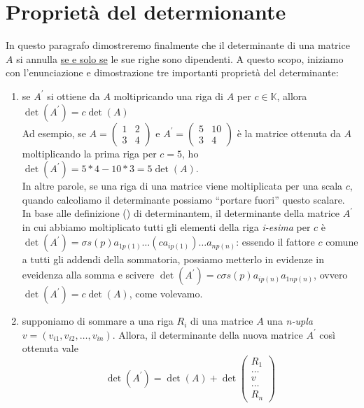 \section{Proprietà del determionante}
In questo paragrafo dimostreremo finalmente che il determinante di una matrice $A$ si annulla \underline{se e solo se} le sue righe sono dipendenti. A questo scopo, iniziamo con l'enunciazione e dimostrazione tre importanti proprietà del determinante:
\begin{enumerate}
\item se $A^\prime$ si ottiene da $A$ moltipricando una riga di $A$ per $c\in \mathds{K}$, allora $\det(A^\prime)=c\det(A)$\\
  Ad esempio, se $A=\begin{pmatrix} 1 & 2 \\ 3 & 4 \end{pmatrix}$ e $A^\prime =\begin{pmatrix} 5 & 10 \\ 3 &4 \end{pmatrix}$ è la matrice ottenuta da $A$ moltiplicando la prima riga per $c=5$, ho $\det(A^\prime)=5*4-10*3=5\det (A)$.\\
  In altre parole, se una riga di una matrice viene moltiplicata per una scala $c$, quando calcoliamo il determinante possiamo ``portare fuori'' questo scalare.\\
  In base alle definizione ({\it <++>}) di determinantem, il determinante della matrice $A^\prime$ in cui abbiamo moltiplicato tutti gli elementi della riga \textit{i-esima} per $c$ è $\det (A^\prime)=\sigma s(p)a_{1p(1)}\dots(ca_{ip(1)})\dots a_{np(n)}$: essendo il fattore $c$ comune a tutti gli addendi della sommatoria, possiamo metterlo in evidenze in eveidenza alla somma e scivere $\det(A^\prime) = c \sigma s(p)a_{ip(n)}a_{1np(n)}$, ovvero $\det(A^\prime)=c\det(A)$, come volevamo.
\item supponiamo di sommare a una riga $R_i$ di una matrice $A$ una \textit{n-upla} $v=(v_{i1},v_{i2},\dots,v_{in})$. Allora, il determinante della nuova matrice $A^\prime$ così ottenuta vale
  \begin{equation}
    \det(A^{\prime})=\det(A)+\det\begin{pmatrix} R_1 \\ \dots \\ v\\ \dots \\ R_n \end{pmatrix}
  \end{equation}

\end{enumerate}
